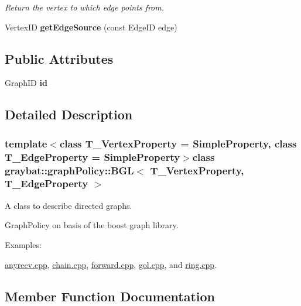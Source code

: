 \begin{DoxyCompactItemize}
\begin{DoxyCompactList}\small\item\em Return the vertex to which {\itshape edge} points from. \end{DoxyCompactList}\item 
\hypertarget{classgraybat_1_1graphPolicy_1_1BGL_ac29f99d16c0fa59f248e8d060ab748e4}{}Vertex\+I\+D {\bfseries get\+Edge\+Source} (const Edge\+I\+D edge)\label{classgraybat_1_1graphPolicy_1_1BGL_ac29f99d16c0fa59f248e8d060ab748e4}

\end{DoxyCompactItemize}
\subsection*{Public Attributes}
\begin{DoxyCompactItemize}
\item 
\hypertarget{classgraybat_1_1graphPolicy_1_1BGL_acdd10fa9cbff26e97387ad12d8fd8726}{}Graph\+I\+D {\bfseries id}\label{classgraybat_1_1graphPolicy_1_1BGL_acdd10fa9cbff26e97387ad12d8fd8726}

\end{DoxyCompactItemize}


\subsection{Detailed Description}
\subsubsection*{template$<$class T\+\_\+\+Vertex\+Property = Simple\+Property, class T\+\_\+\+Edge\+Property = Simple\+Property$>$class graybat\+::graph\+Policy\+::\+B\+G\+L$<$ T\+\_\+\+Vertex\+Property, T\+\_\+\+Edge\+Property $>$}

A class to describe directed graphs. 

Graph\+Policy on basis of the boost graph library. \begin{Desc}
\item[Examples\+: ]\par
\hyperlink{anyrecv_8cpp-example}{anyrecv.\+cpp}, \hyperlink{chain_8cpp-example}{chain.\+cpp}, \hyperlink{forward_8cpp-example}{forward.\+cpp}, \hyperlink{gol_8cpp-example}{gol.\+cpp}, and \hyperlink{ring_8cpp-example}{ring.\+cpp}.\end{Desc}


\subsection{Member Function Documentation}
\hypertarget{classgraybat_1_1graphPolicy_1_1BGL_a93884489eaf5a2b8367c1cf04c0a3434}{}

